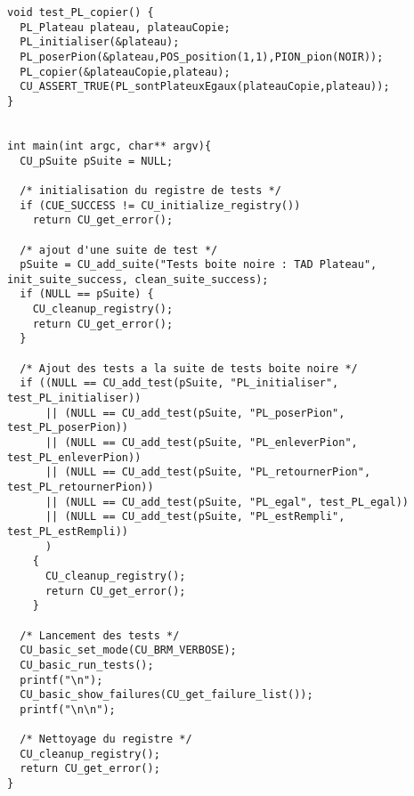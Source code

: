 \begin{lstlisting}
void test_PL_copier() {
  PL_Plateau plateau, plateauCopie;
  PL_initialiser(&plateau);
  PL_poserPion(&plateau,POS_position(1,1),PION_pion(NOIR));
  PL_copier(&plateauCopie,plateau);
  CU_ASSERT_TRUE(PL_sontPlateuxEgaux(plateauCopie,plateau));
}


int main(int argc, char** argv){
  CU_pSuite pSuite = NULL;

  /* initialisation du registre de tests */
  if (CUE_SUCCESS != CU_initialize_registry())
    return CU_get_error();

  /* ajout d'une suite de test */
  pSuite = CU_add_suite("Tests boite noire : TAD Plateau", init_suite_success, clean_suite_success);
  if (NULL == pSuite) {
    CU_cleanup_registry();
    return CU_get_error();
  }

  /* Ajout des tests a la suite de tests boite noire */
  if ((NULL == CU_add_test(pSuite, "PL_initialiser", test_PL_initialiser))
      || (NULL == CU_add_test(pSuite, "PL_poserPion", test_PL_poserPion))
      || (NULL == CU_add_test(pSuite, "PL_enleverPion", test_PL_enleverPion))
      || (NULL == CU_add_test(pSuite, "PL_retournerPion", test_PL_retournerPion))
      || (NULL == CU_add_test(pSuite, "PL_egal", test_PL_egal))
      || (NULL == CU_add_test(pSuite, "PL_estRempli", test_PL_estRempli))
      )
    {
      CU_cleanup_registry();
      return CU_get_error();
    }

  /* Lancement des tests */
  CU_basic_set_mode(CU_BRM_VERBOSE);
  CU_basic_run_tests();
  printf("\n");
  CU_basic_show_failures(CU_get_failure_list());
  printf("\n\n");

  /* Nettoyage du registre */
  CU_cleanup_registry();
  return CU_get_error();
}
\end{lstlisting}

